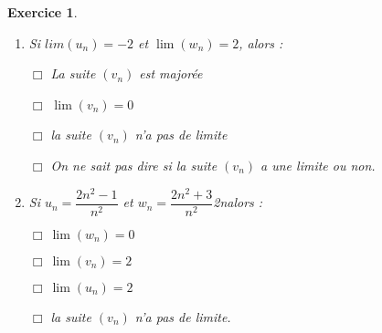 \documentclass[12pt,a4paper,french]{article}
\theoremstyle{break}
\newtheorem{exercice}{Exercice}
\theoremstyle{nonumberplain}
\theoremstyle{nonumberbreak}
\begin{document}
\begin{exercice}
\begin{enumerate}
    \item Si $lim \left(u_{n}\right) = - 2$ et $\lim \left(w_{n}\right)
      = 2$, alors :

      $\Box$ La suite $\left(v_{n}\right)$ est majorée

      $\Box$ $\lim \left(v_{n}\right) = 0$

      $\Box$ la suite $\left(v_{n}\right)$ n'a pas de limite

      $\Box$ On ne sait pas dire si la suite $\left(v_{n}\right)$ a une
      limite ou non.

    \item Si $u_{n} =\dfrac{2n^2-1}{n^2}$ et  $w_{n} =
      \dfrac{2n^2+3}{n^2}$2nalors :

      $\Box~ \lim \left(w_{n}\right) = 0$

      $\Box~ \lim \left(v_{n}\right) = 2$

      $\Box~  \lim \left(u_{n}\right) = 2$

      $\Box$ la suite $\left(v_{n}\right)$ n'a pas de limite.

  \end{enumerate}
\end{exercice}

\pagebreak
\end{document}

